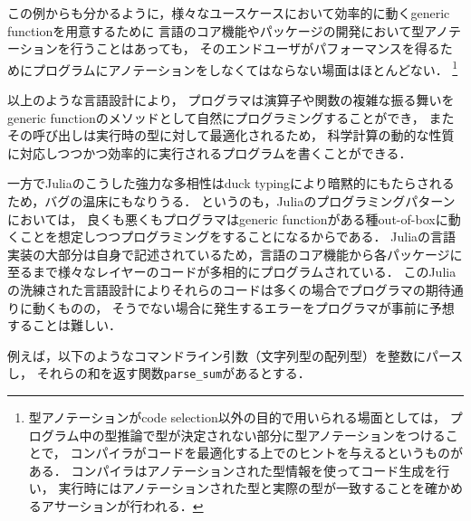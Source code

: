 この例からも分かるように，様々なユースケースにおいて効率的に動くgeneric functionを用意するために
言語のコア機能やパッケージの開発において型アノテーションを行うことはあっても，
そのエンドユーザがパフォーマンスを得るためにプログラムにアノテーションをしなくてはならない場面はほとんどない．
\footnote{
  型アノテーションがcode selection以外の目的で用いられる場面としては，
  プログラム中の型推論で型が決定されない部分に型アノテーションをつけることで，
  コンパイラがコードを最適化する上でのヒントを与えるというものがある\cite{type-annotation}．
  コンパイラはアノテーションされた型情報を使ってコード生成を行い，
  実行時にはアノテーションされた型と実際の型が一致することを確かめるアサーションが行われる．
}

以上のような言語設計により，
プログラマは演算子や関数の複雑な振る舞いをgeneric functionのメソッドとして自然にプログラミングすることができ\footnotemark，
またその呼び出しは実行時の型に対して最適化されるため，
科学計算の動的な性質に対応しつつかつ効率的に実行されるプログラムを書くことができる．


\vspace{1ex}

一方でJuliaのこうした強力な多相性はduck typingにより暗黙的にもたらされるため，バグの温床にもなりうる．
というのも，Juliaのプログラミングパターンにおいては，
良くも悪くもプログラマはgeneric functionがある種out-of-boxに動くことを想定しつつプログラミングをすることになるからである．
Juliaの言語実装の大部分は自身で記述されているため，言語のコア機能から各パッケージに至るまで様々なレイヤーのコードが多相的にプログラムされている．
このJuliaの洗練された言語設計によりそれらのコードは多くの場合でプログラマの期待通りに動くものの，
そうでない場合に発生するエラーをプログラマが事前に予想することは難しい．

例えば，以下のようなコマンドライン引数（文字列型の配列型）を整数にパースし，
それらの和を返す関数\verb|parse_sum|があるとする．

